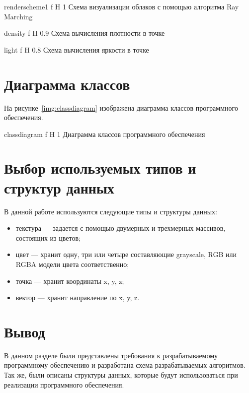 {renderscheme1} %
{f} %
{H} %
{1\textwidth} %
{Схема визуализации облаков с помощью алгоритма Ray Marching} %


{density} %
{f} %
{H} %
{0.9\textwidth} %
{Схема вычисления плотности в точке} %

{light} %
{f} %
{H} %
{0.8\textwidth} %
{Схема вычисления яркости в точке} %

\section{Диаграмма классов}

На рисунке~\ref{img:classdiagram} изображена диаграмма классов программного обеспечения.

{classdiagram} %
{f} %
{H} %
{1\textwidth} %
{Диаграмма классов программного обеспечения} %


\section{Выбор используемых типов и структур данных}

В данной работе используются следующие типы и структуры данных:
\begin{itemize}
	\item текстура --- задается с помощью двумерных и трехмерных массивов, состоящих из цветов;
	\item цвет --- хранит одну, три или четыре составляющие grayscale, RGB или RGBA модели цвета соответственно;
	\item точка --- хранит координаты x, y, z;
	\item вектор --- хранит направление по x, y, z.
\end{itemize}


\section*{Вывод}
В данном разделе были представлены требования к разрабатываемому
программному обеспечению и разработана схема разрабатываемых алгоритмов.
Так же, были описаны структуры данных, которые будут использоваться при реализации программного обеспечения.

